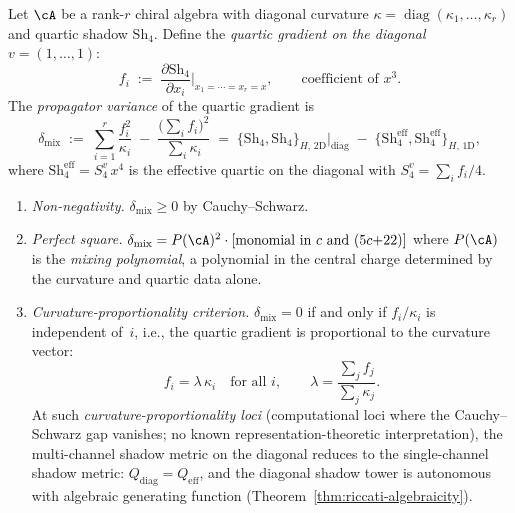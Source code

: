 \begin{proposition}
\label{thm:propagator-variance}
\ClaimStatusProvedHere
{}
Let $\cA$ be a rank-$r$ chiral algebra with diagonal curvature
$\kappa = \operatorname{diag}(\kappa_1, \dotsc, \kappa_r)$
and quartic shadow $\mathrm{Sh}_4$.  Define the
\emph{quartic gradient on the diagonal} $v = (1,\dotsc,1)$:
\begin{equation}\label{eq:quartic-gradient}
  f_i
  \;:=\;
  \frac{\partial \mathrm{Sh}_4}{\partial x_i}
  \bigg|_{x_1 = \dotsb = x_r = x},
  \qquad
  \text{coefficient of $x^3$}.
\end{equation}
The \emph{propagator variance} of the quartic gradient is
\begin{equation}\label{eq:propagator-variance}
  \delta_{\mathrm{mix}}
  \;:=\;
  \sum_{i=1}^r \frac{f_i^2}{\kappa_i}
  \;-\;
  \frac{\bigl(\sum_i f_i\bigr)^2}{\sum_i \kappa_i}
  \;=\;
  \bigl\{\mathrm{Sh}_4, \mathrm{Sh}_4\bigr\}_{H,\,2\text{D}}
  \big|_{\mathrm{diag}}
  \;-\;
  \bigl\{\mathrm{Sh}_4^{\mathrm{eff}},
  \mathrm{Sh}_4^{\mathrm{eff}}\bigr\}_{H,\,1\text{D}},
\end{equation}
where $\mathrm{Sh}_4^{\mathrm{eff}} = S_4^v\,x^4$ is the effective
quartic on the diagonal with $S_4^v = \sum_i f_i / 4$.

\begin{enumerate}[label=\textup{(\roman*)}]
\item \emph{Non-negativity.}
  $\delta_{\mathrm{mix}} \geq 0$ by Cauchy--Schwarz.

\item \emph{Perfect square.}
  $\delta_{\mathrm{mix}} = P(\cA)^2 \cdot
  [\text{monomial in $c$ and $(5c{+}22)$}]$
  where $P(\cA)$ is the \emph{mixing polynomial}, a polynomial in
  the central charge determined by the curvature and quartic data alone.

\item \emph{Curvature-proportionality criterion.}
  $\delta_{\mathrm{mix}} = 0$ if and only if
  $f_i / \kappa_i$ is independent of~$i$, i.e., the quartic
  gradient is proportional to the curvature vector:
  \begin{equation}\label{eq:curvature-proportionality}
    f_i = \lambda\,\kappa_i
    \quad\text{for all $i$},
    \qquad
    \lambda = \frac{\sum_j f_j}{\sum_j \kappa_j}.
  \end{equation}
  At such \emph{curvature-proportionality loci} (computational loci where the Cauchy--Schwarz gap vanishes; no known representation-theoretic interpretation), the multi-channel
  shadow metric on the diagonal reduces to the single-channel
  shadow metric: $Q_{\mathrm{diag}} = Q_{\mathrm{eff}}$, and
  the diagonal shadow tower is autonomous with algebraic
  generating function
  \textup{(}Theorem~\textup{\ref{thm:riccati-algebraicity}}).


\end{enumerate}
\end{proposition}
